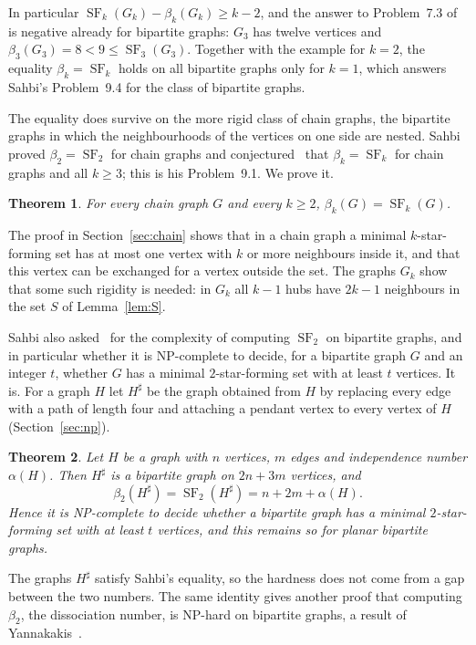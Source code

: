 \documentclass[11pt]{amsart}
\newtheorem{theorem}{Theorem}[section]
\theoremstyle{definition}
\theoremstyle{remark}
\newcommand{\SF}{\operatorname{SF}}
\begin{document}
In particular $\SF_k(G_k)-\beta_k(G_k)\ge k-2$, and the answer to Problem~7.3 of~\cite{Sa} is negative already for bipartite graphs: $G_3$ has twelve vertices and $\beta_3(G_3)=8<9\le\SF_3(G_3)$. Together with the example for $k=2$, the equality $\beta_k=\SF_k$ holds on all bipartite graphs only for $k=1$, which answers Sahbi's Problem~9.4 for the class of bipartite graphs.

The equality does survive on the more rigid class of chain graphs, the bipartite graphs in which the neighbourhoods of the vertices on one side are nested. Sahbi proved $\beta_2=\SF_2$ for chain graphs and conjectured~\cite[Conjecture~6.4]{Sa} that $\beta_k=\SF_k$ for chain graphs and all $k\ge3$; this is his Problem~9.1. We prove it.

\begin{theorem}\label{thm:chain}
For every chain graph $G$ and every $k\ge2$, $\beta_k(G)=\SF_k(G)$.
\end{theorem}

The proof in Section~\ref{sec:chain} shows that in a chain graph a minimal $k$-star-forming set has at most one vertex with $k$ or more neighbours inside it, and that this vertex can be exchanged for a vertex outside the set. The graphs $G_k$ show that some such rigidity is needed: in $G_k$ all $k-1$ hubs have $2k-1$ neighbours in the set $S$ of Lemma~\ref{lem:S}.

Sahbi also asked~\cite[Problem~9.3]{Sa} for the complexity of computing $\SF_2$ on bipartite graphs, and in particular whether it is NP-complete to decide, for a bipartite graph $G$ and an integer $t$, whether $G$ has a minimal $2$-star-forming set with at least $t$ vertices. It is. For a graph $H$ let $H^\sharp$ be the graph obtained from $H$ by replacing every edge with a path of length four and attaching a pendant vertex to every vertex of $H$ (Section~\ref{sec:np}).

\begin{theorem}\label{thm:np}
Let $H$ be a graph with $n$ vertices, $m$ edges and independence number $\alpha(H)$. Then $H^\sharp$ is a bipartite graph on $2n+3m$ vertices, and
\[
\beta_2(H^\sharp)=\SF_2(H^\sharp)=n+2m+\alpha(H).
\]
Hence it is NP-complete to decide whether a bipartite graph has a minimal $2$-star-forming set with at least $t$ vertices, and this remains so for planar bipartite graphs.
\end{theorem}

The graphs $H^\sharp$ satisfy Sahbi's equality, so the hardness does not come from a gap between the two numbers. The same identity gives another proof that computing $\beta_2$, the dissociation number, is NP-hard on bipartite graphs, a result of Yannakakis~\cite{Ya}.
\end{document}
